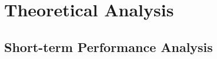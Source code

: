 \section{Theoretical Analysis} \label{sec:th_ana}

\subsection{Short-term Performance Analysis} \label{ssec:stpa}


